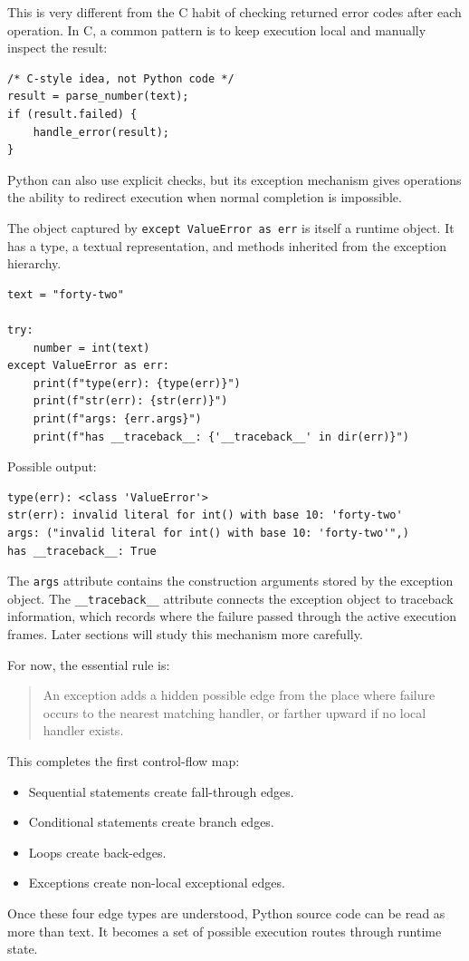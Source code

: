 This is very different from the C habit of checking returned error codes after each operation. In C, a common pattern is to keep execution local and manually inspect the result:

\begin{verbatim}
/* C-style idea, not Python code */
result = parse_number(text);
if (result.failed) {
    handle_error(result);
}
\end{verbatim}

Python can also use explicit checks, but its exception mechanism gives operations the ability to redirect execution when normal completion is impossible.

The object captured by \texttt{except ValueError as err} is itself a runtime object. It has a type, a textual representation, and methods inherited from the exception hierarchy.

\begin{verbatim}
text = "forty-two"

try:
    number = int(text)
except ValueError as err:
    print(f"type(err): {type(err)}")
    print(f"str(err): {str(err)}")
    print(f"args: {err.args}")
    print(f"has __traceback__: {'__traceback__' in dir(err)}")
\end{verbatim}

Possible output:

\begin{verbatim}
type(err): <class 'ValueError'>
str(err): invalid literal for int() with base 10: 'forty-two'
args: ("invalid literal for int() with base 10: 'forty-two'",)
has __traceback__: True
\end{verbatim}

The \texttt{args} attribute contains the construction arguments stored by the exception object. The \texttt{\_\_traceback\_\_} attribute connects the exception object to traceback information, which records where the failure passed through the active execution frames. Later sections will study this mechanism more carefully.

For now, the essential rule is:

\begin{quote}
An exception adds a hidden possible edge from the place where failure occurs to the nearest matching handler, or farther upward if no local handler exists.
\end{quote}

This completes the first control-flow map:

\begin{itemize}
    \item Sequential statements create fall-through edges.
    \item Conditional statements create branch edges.
    \item Loops create back-edges.
    \item Exceptions create non-local exceptional edges.
\end{itemize}

Once these four edge types are understood, Python source code can be read as more than text. It becomes a set of possible execution routes through runtime state.